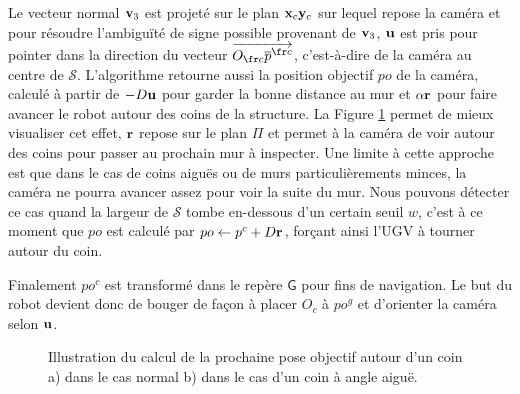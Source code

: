 Le vecteur normal $\mathbf{v}_3$ est projeté sur le plan $\mathbf{x}_c\mathbf{y}_c$ sur lequel repose la caméra et pour résoudre l'ambiguïté de signe possible provenant de $\mathbf{v}_3$, $\mathbf{u}$ est pris pour pointer dans la direction du vecteur $\overrightarrow{O_{\fr c} \overline{p}^{\fr c}}$, c'est-à-dire de la caméra au centre de $\mathcal{S}$. L'algorithme retourne aussi la position objectif ${po}$ de la caméra, calculé à partir de $-D\mathbf{u}$ pour garder la bonne distance au mur et $\alpha \mathbf{r}$ pour faire avancer le robot autour des coins de la structure. La Figure \ref{fig:ugv_goal_determination} permet de mieux visualiser cet effet, $\mathbf{r}$ repose sur le plan $\Pi$ et permet à la caméra de voir autour des coins pour passer au prochain mur à inspecter. Une limite à cette approche est que dans le cas de coins aiguës ou de murs particulièrements minces, la caméra ne pourra avancer assez pour voir la suite du mur. Nous pouvons détecter ce cas quand la largeur de $\mathcal{S}$ tombe en-dessous d'un certain seuil $w$, c'est à ce moment que ${po}$ est calculé par ${po} \gets p^c + D \mathbf{r}$, forçant ainsi l'UGV à tourner autour du coin.

Finalement ${po^c}$ est transformé dans le repère $\mathsf{G}$ pour fins de navigation. Le but du robot devient donc de bouger de façon à placer $O_c$ à ${po^g}$ et d'orienter la caméra selon $\mathbf{u}$.

\begin{figure}[ht]
  \centering
  \hfil
  \caption{
    Illustration du calcul de la prochaine pose objectif autour d'un coin a) dans le cas normal b) dans le cas d'un coin à angle aiguë.
  }
  \label{fig:ugv_goal_determination}
\end{figure}

